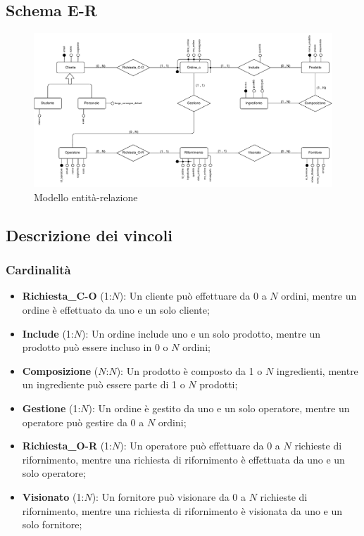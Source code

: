 \documentclass[12pt,a4paper]{article}
\begin{document}
    \subsection{Schema E-R}
    \begin{figure}[H]
        \centering
        \vspace{-20pt}  %
        \includegraphics[width=1\textwidth]{figures/Conceptual_model.pdf}
        \vspace{-20pt}  %
        \caption{Modello entità-relazione}
        \label{fig:Conceptual_model}
    \end{figure} 

    \subsection{Descrizione dei vincoli}
    \subsubsection{Cardinalità}
    \begin{itemize}[leftmargin=1em]
        \item \textbf{Richiesta\_C-O} (1:\(N\)): Un cliente può effettuare da 0 a \(N\) ordini, mentre un ordine è effettuato da uno e un solo cliente;
        \item \textbf{Include} (1:\(N\)): Un ordine include uno e un solo prodotto, mentre un prodotto può essere incluso in 0 o \(N\) ordini;
        \item \textbf{Composizione} (\(N\):\(N\)): Un prodotto è composto da 1 o \(N\) ingredienti, mentre un ingrediente può essere parte di 1 o \(N\) prodotti;
        \item \textbf{Gestione} (1:\(N\)): Un ordine è gestito da uno e un solo operatore, mentre un operatore può gestire da 0 a \(N\) ordini;
        \item \textbf{Richiesta\_O-R} (1:\(N\)): Un operatore può effettuare da 0 a \(N\) richieste di rifornimento, mentre una richiesta di rifornimento è effettuata da uno e un solo operatore;
        \item \textbf{Visionato} (1:\(N\)): Un fornitore può visionare da 0 a \(N\) richieste di rifornimento, mentre una richiesta di rifornimento è visionata da uno e un solo fornitore;
    \end{itemize}
\end{document}
